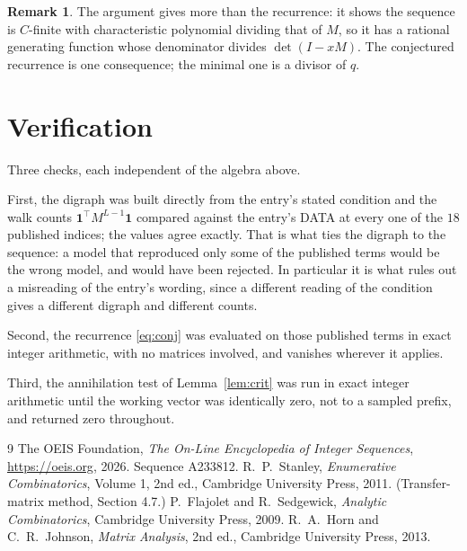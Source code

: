 \documentclass[11pt,a4paper]{article}
\theoremstyle{plain}
\theoremstyle{definition}
\newtheorem{remark}[theorem]{Remark}
\begin{document}
\begin{remark}
The argument gives more than the recurrence: it shows the sequence is $C$-finite with
characteristic polynomial dividing that of $M$, so it has a rational generating function
whose denominator divides $\det(I-xM)$. The conjectured recurrence is one consequence; the
minimal one is a divisor of $q$.
\end{remark}

\section{Verification}

Three checks, each independent of the algebra above.

First, the digraph was built directly from the entry's stated condition and the walk counts
$\mathbf{1}^{\!\top}M^{L-1}\mathbf{1}$ compared against the entry's DATA at
every one of the $18$ published indices; the values agree exactly. That is what ties
the digraph to the sequence: a model that reproduced only some of the published terms would
be the wrong model, and would have been rejected. In particular it is what rules out a
misreading of the entry's wording, since a different reading of the condition gives a
different digraph and different counts.

Second, the recurrence \eqref{eq:conj} was evaluated on those published terms in exact
integer arithmetic, with no matrices involved, and vanishes wherever it applies.

Third, the annihilation test of Lemma~\ref{lem:crit} was run in exact integer arithmetic
until the working vector was identically zero, not to a sampled prefix, and returned zero
throughout.

\begin{thebibliography}{9}
 The OEIS Foundation, \emph{The On-Line Encyclopedia of Integer
Sequences}, \url{https://oeis.org}, 2026. Sequence A233812.
 R.~P.~Stanley, \emph{Enumerative Combinatorics}, Volume 1, 2nd ed.,
Cambridge University Press, 2011. (Transfer-matrix method, Section 4.7.)
 P.~Flajolet and R.~Sedgewick, \emph{Analytic Combinatorics}, Cambridge
University Press, 2009.
 R.~A.~Horn and C.~R.~Johnson, \emph{Matrix Analysis}, 2nd ed., Cambridge
University Press, 2013.
\end{thebibliography}
\end{document}
